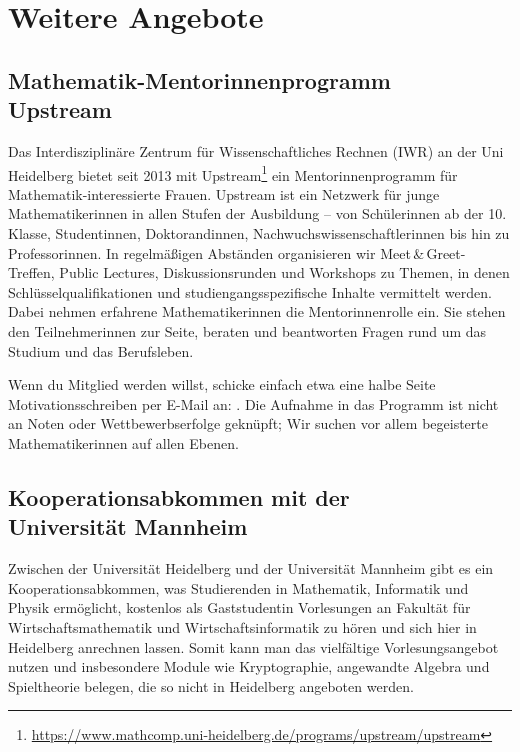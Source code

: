 \section{Weitere Angebote}

\subsection{Mathematik-Mentorinnenprogramm \\Upstream}
Das Interdisziplinäre Zentrum für Wissenschaftliches Rechnen (IWR) an der Uni Heidelberg bietet seit 2013 mit Upstream\footnote{\url{https://www.mathcomp.uni-heidelberg.de/programs/upstream/upstream}} ein Mentorinnenprogramm für Mathematik-interessierte Frauen. Upstream ist ein Netzwerk für junge Mathematikerinnen in allen Stufen der Ausbildung -- von Schülerinnen ab der 10. Klasse, Studentinnen, Doktorandinnen, Nachwuchswissenschaftlerinnen bis hin zu Professorinnen. In regelmäßigen Abständen organisieren wir Meet\,\&\,Greet-Treffen, Public Lectures, Diskussionsrunden und Workshops zu Themen, in denen Schlüsselqualifikationen und studiengangsspezifische Inhalte vermittelt werden. Dabei nehmen erfahrene Mathematikerinnen die Mentorinnenrolle ein. Sie stehen den Teilnehmerinnen zur Seite, beraten und beantworten Fragen rund um das Studium und das Berufsleben.

Wenn du Mitglied werden willst, schicke einfach etwa eine halbe Seite Motivationsschreiben per E-Mail an: . Die Aufnahme in das Programm ist nicht an Noten oder Wettbewerbserfolge geknüpft; Wir suchen vor allem begeisterte Mathematikerinnen auf allen Ebenen.

\subsection{Kooperationsabkommen mit der \\Universität Mannheim}
Zwischen der Universität Heidelberg und der Universität Mannheim gibt es ein Kooperationsabkommen, was Studierenden in Mathematik, Informatik und Physik ermöglicht, kostenlos als Gaststudentin Vorlesungen an Fakultät für Wirtschaftsmathematik und Wirtschaftsinformatik zu hören und sich hier in Heidelberg anrechnen lassen. 
Somit kann man das vielfältige Vorlesungsangebot nutzen und insbesondere Module wie Kryptographie, angewandte Algebra und Spieltheorie belegen, die so nicht in Heidelberg angeboten werden.
